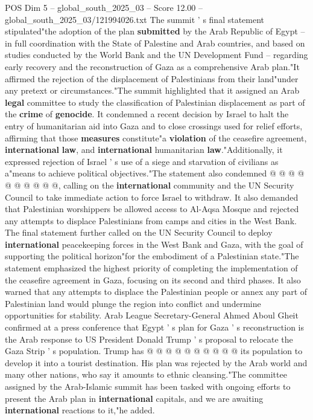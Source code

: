 \begin{textsample}{POS Dim 5 – global\_south\_2025\_03 – Score 12.00 – global\_south\_2025\_03/121994026.txt}  \label{ex:f5_pos_188}
The summit ' s final statement stipulated"the adoption of the plan \textbf{submitted} by the Arab Republic of Egypt -- in full coordination with the State of Palestine and Arab countries, and based on studies conducted by the World Bank and the UN Development Fund -- regarding early recovery and the reconstruction of Gaza as a comprehensive Arab plan."It affirmed the rejection of the displacement of Palestinians from their land"under any pretext or circumstances."The summit highlighted that it assigned an Arab \textbf{legal} committee to study the classification of Palestinian displacement as part of the \textbf{crime} of \textbf{genocide}.
It condemned a recent decision by Israel to halt the entry of humanitarian aid into Gaza and to close crossings used for relief efforts, affirming that those \textbf{measures} constitute"a \textbf{violation} of the ceasefire agreement, \textbf{international} \textbf{law}, and \textbf{international} humanitarian \textbf{law}."Additionally, it expressed rejection of Israel ' s use of a siege and starvation of civilians as a"means to achieve political objectives."The statement also condemned @ @ @ @ @ @ @ @ @ @, calling on the \textbf{international} community and the UN Security Council to take immediate action to force Israel to withdraw.
It also demanded that Palestinian worshippers be allowed access to Al-Aqsa Mosque and rejected any attempts to displace Palestinians from camps and cities in the West Bank.
The final statement further called on the UN Security Council to deploy \textbf{international} peacekeeping forces in the West Bank and Gaza, with the goal of supporting the political horizon"for the embodiment of a Palestinian state."The statement emphasized the highest priority of completing the implementation of the ceasefire agreement in Gaza, focusing on its second and third phases.
It also warned that any attempts to displace the Palestinian people or annex any part of Palestinian land would plunge the region into conflict and undermine opportunities for stability.
Arab League Secretary-General Ahmed Aboul Gheit confirmed at a press conference that Egypt ' s plan for Gaza ' s reconstruction is the Arab response to US President Donald Trump ' s proposal to relocate the Gaza Strip ' s population.
Trump has @ @ @ @ @ @ @ @ @ @ its population to develop it into a tourist destination.
His plan was rejected by the Arab world and many other nations, who say it amounts to ethnic cleansing."The committee assigned by the Arab-Islamic summit has been tasked with ongoing efforts to present the Arab plan in \textbf{international} capitals, and we are awaiting \textbf{international} reactions to it,"he added.

\end{textsample}
